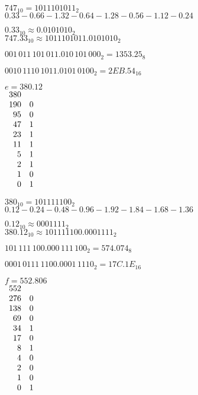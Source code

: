 \documentclass[a4paper,12pt]{article}
\begin{document}
$747_{10} = 1011101011_2$
\\

$0.33 - 0.66 - 1.32 - 0.64 - 1.28 - 0.56 - 1.12 - 0.24$

$0.33_{10} \approx 0.0101010_2$
\\

$747.33_{10} \approx 1011101011.0101010_2$

$001 \, 011 \, 101 \, 011.010 \, 101 \, 000_2 = 1353.25_8$

$0010 \, 1110 \, 1011.0101 \, 0100_2 = 2EB.54_{16}$

\newpage




$e = 380.12$
\\

$\begin{array}{r l}
380 & \\
190 & 0 \\
95 & 0 \\
47 & 1 \\
23 & 1 \\
11 & 1 \\
5 & 1 \\
2 & 1 \\
1 & 0 \\
0 & 1 \\
\end{array}$

$380_{10} = 101111100_2$
\\

$0.12 - 0.24 - 0.48 - 0.96 - 1.92 - 1.84 - 1.68 - 1.36$

$0.12_{10} \approx 0001111_2$
\\

$380.12_{10} \approx 101111100.0001111_2$

$101 \, 111 \, 100.000 \, 111 \, 100_2 = 574.074_8$

$0001 \, 0111 \, 1100.0001 \, 1110_2 = 17C.1E_{16}$

\newpage




$f = 552.806$
\\

$\begin{array}{r l}
552 & \\
276 & 0 \\
138 & 0 \\
69 & 0 \\
34 & 1 \\
17 & 0 \\
8 & 1 \\
4 & 0 \\
2 & 0 \\
1 & 0 \\
0 & 1 \\
\end{array}$
\end{document}
